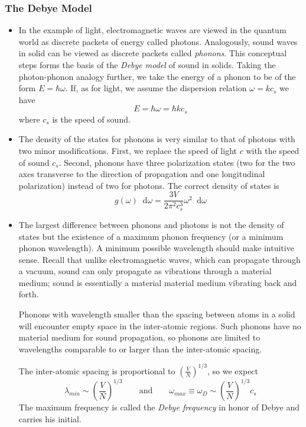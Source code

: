 \documentclass[11pt, a4paper]{article}
\newcommand{\diff}{\mathop{}\!\mathrm{d}} %
\begin{document}
\subsubsection{The Debye Model}
\begin{itemize}
	\item In the example of light, electromagnetic waves are viewed in the quantum world as discrete packets of energy called photons. Analogously, sound waves in solid can be viewed as discrete packets called \textit{phonons}. This conceptual steps forms the basis of the \textit{Debye model} of sound in solids. Taking the photon-phonon analogy further, we take the energy of a phonon to be of the form $ E = \hbar \omega $. If, as for light, we assume the dispersion relation $ \omega = k c_{s} $ we have
	\begin{equation*}
		E = \hbar \omega = \hbar k c_{s}
	\end{equation*}
	where $ c_{s} $ is the speed of sound.
	
	\item The density of the states for phonons is very similar to that of photons with two minor modifications. First, we replace the speed of light $ c $ with the speed of sound $ c_{s} $. Second, phonons have three polarization states (two for the two axes transverse to the direction of propagation and one longitudinal polarization) instead of two for photons. The correct density of states is
	\begin{equation*}
		g(\omega)\diff \omega = \frac{3V}{2\pi^{2}c_{s}^{3}} \omega^{2} \diff \omega
	\end{equation*}
	
	\item The largest difference between phonons and photons is not the density of states but the existence of a maximum phonon frequency (or a minimum phonon wavelength). A minimum possible wavelength should make intuitive sense. Recall that unlike electromagnetic waves, which can propagate through a vacuum, sound can only propagate as vibrations through a material medium; sound is essentially a material material medium vibrating back and forth. 
	
	Phonons with wavelength smaller than the spacing between atoms in a solid will encounter empty space in the inter-atomic regions. Such phonons have no material medium for sound propagation, so phonons are limited to wavelengths comparable to or larger than the inter-atomic spacing. 
	
	The inter-atomic spacing is proportional to $ \left(\frac{V}{N}\right)^{1/3} $, so we expect
	\begin{equation*}
		\lambda_{min} \sim \left(\frac{V}{N}\right)^{1/3} \qquad \text{and} \qquad \omega_{max} \equiv \omega_{D} \sim \left(\frac{V}{N}\right)^{1/3} c_{s}
	\end{equation*}
	The maximum frequency is called the \textit{Debye frequency} in honor of Debye and carries his initial.
	

\end{itemize}
\end{document}

